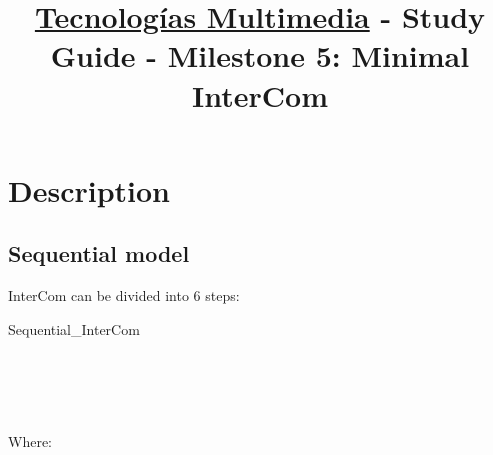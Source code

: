 \title{\href{https://www.ual.es/estudios/grados/presentacion/plandeestudios/asignatura/4015/40154321?idioma=zh_CN}{Tecnologías Multimedia} - Study Guide - Milestone 5: Minimal InterCom}

\maketitle

\section{Description}

\subsection{Sequential model}

InterCom can be divided into 6 steps:

\begin{pseudocode}{Sequential\_InterCom}{~}
  \BEGIN
     \GETS {}\\
     \GETS {}\\
    \\
     \GETS {}\\
     \GETS {}\\
  \END
\end{pseudocode}

Where:

